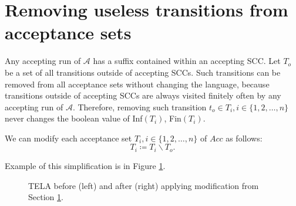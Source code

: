 \documentclass[
  digital, %
  twoside, %
  table,   %
  lof,     %
  lot,     %
]{fithesis3}
\begin{document}
\section{Removing useless transitions from acceptance sets}
\label{sec:remove_out_transition}
Any accepting run of $\mathcal{A}$ has a suffix contained within an accepting SCC. Let $T_{o}$ be a set of all transitions outside of accepting SCCs. Such transitions can be removed from all acceptance sets without changing the language, because transitions outside of accepting SCCs are always visited finitely often by any accepting run of $\mathcal{A}$. Therefore, removing such transition $t_{o} \in T_i, i \in \{1, 2, \dots, n\}$ never changes the boolean value of Inf$(T_i)$, Fin$(T_i)$.

We can modify each acceptance set $T_i, i \in \{1, 2, \dots, n\}$ of $Acc$ as follows:
\begin{equation*}
  T_i \coloneqq T_i \smallsetminus T_{o}.
\end{equation*}

Example of this simplification is in Figure \ref{fig:remove_useless}.

\begin{figure}[h]
  \centering
  \caption{TELA before (left) and after (right) applying modification from Section \ref{sec:remove_out_transition}.}
  \label{fig:remove_useless}
\end{figure}
\end{document}

